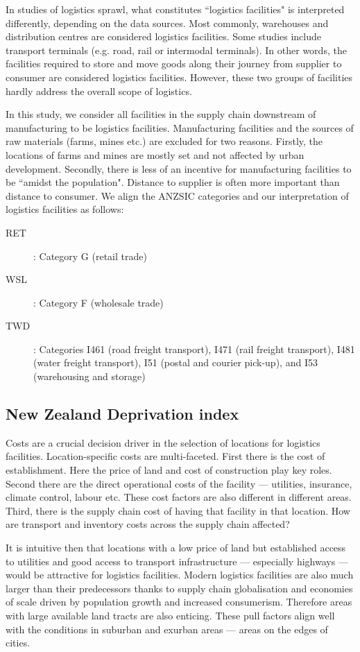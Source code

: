 \documentclass[3p, a4paper, authoryear, 11pt, fleqn, review]{elsarticle}
\begin{document}
In studies of logistics sprawl, what constitutes ``logistics facilities" is interpreted differently, depending on the data sources. Most commonly, warehouses and distribution centres are considered logistics facilities. Some studies include transport terminals (e.g. road, rail or intermodal terminals). In other words, the facilities required to store and move goods along their journey from supplier to consumer are considered logistics facilities. However, these two groups of facilities hardly address the overall scope of logistics. 

In this study, we consider all facilities in the supply chain downstream of manufacturing to be logistics facilities. Manufacturing facilities and the sources of raw materials (farms, mines etc.) are excluded for two reasons. Firstly, the locations of farms and mines are mostly set and not affected by urban development. Secondly, there is less of an incentive for manufacturing facilities to be ``amidst the population". Distance to supplier is often more important than distance to consumer. We align the \ac{ANZSIC} categories and our interpretation of logistics facilities as follows:

\begin{description}
\item[\ac{RET}]: Category G (retail trade)
\item[\ac{WSL}]: Category F	(wholesale trade)
\item[\ac{TWD}]: Categories I461 (road freight transport), I471 (rail freight transport), I481 (water freight transport), I51 (postal and courier pick-up), and I53 (warehousing and storage)
\end{description}

\subsection{New Zealand Deprivation index}
Costs are a crucial decision driver in the selection of locations for logistics facilities. Location-specific costs are multi-faceted. First there is the cost of establishment. Here the price of land and cost of construction play key roles. Second there are the direct operational costs of the facility --- utilities, insurance, climate control, labour etc. These cost factors are also different in different areas. Third, there is the supply chain cost of having that facility in that location. How are transport and inventory costs across the supply chain affected? 

It is intuitive then that locations with a low price of land but established access to utilities and good access to transport infrastructure --- especially highways --- would be attractive for logistics facilities. Modern logistics facilities are also much larger than their predecessors thanks to supply chain globalisation and economies of scale driven by population growth and increased consumerism. Therefore areas with large available land tracts are also enticing. These pull factors align well with the conditions in suburban and exurban areas --- areas on the edges of cities. 
\end{document}
